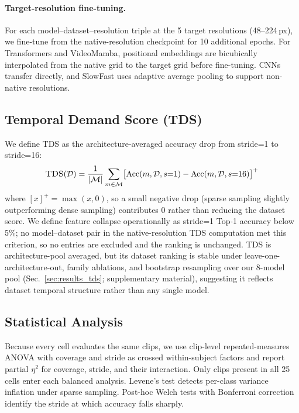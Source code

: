 \documentclass[runningheads]{llncs}
\newcommand{\TDS}{\textsc{TDS}}
\newcommand{\rev}[1]{\textcolor{revblue}{#1}}
\newcommand{\revdel}[1]{}
\begin{document}
\paragraph{Target-resolution fine-tuning.}
For each model--dataset--resolution triple at the 5 target resolutions (48--224\,px), we fine-tune from the native-resolution checkpoint for 10 additional epochs. For Transformers and VideoMamba, positional embeddings are bicubically interpolated from the native grid to the target grid before fine-tuning. CNNs transfer directly, and SlowFast uses adaptive average pooling to support non-native resolutions.

\subsection{Temporal Demand Score (\texorpdfstring{\TDS{}}{TDS})}

We define \TDS{} as the architecture-averaged accuracy drop from stride=1 to stride=16:
\begin{equation}
  \TDS(\mathcal{D}) = \frac{1}{|\mathcal{M}|} \sum_{m\in\mathcal{M}} \bigl[\mathrm{Acc}(m,\mathcal{D},s{=}1) - \mathrm{Acc}(m,\mathcal{D},s{=}16)\bigr]^+
  \label{eq:tds}
\end{equation}
where $[x]^+=\max(x,0)$, so a small negative drop (sparse sampling slightly outperforming dense sampling) contributes 0 rather than reducing the dataset score. We define feature collapse operationally as stride=1 Top-1 accuracy below 5\%; no model--dataset pair in the native-resolution \TDS{} computation met this criterion, so no entries are excluded and the ranking is unchanged. \TDS{} is architecture-pool averaged, but its dataset ranking is stable under leave-one-architecture-out, family ablations, and bootstrap resampling over our 8-model pool (Sec.~\ref{sec:results_tds}; supplementary material), suggesting it reflects dataset temporal structure rather than any single model.

\subsection{Statistical Analysis}

\revdel{For each model-dataset pair, two-way ANOVA decomposes accuracy variance into coverage and stride components (effect size $\eta^2$).} \rev{Because every cell evaluates the same clips, we use clip-level repeated-measures ANOVA with coverage and stride as crossed within-subject factors and report partial $\eta^2$ for coverage, stride, and their interaction. Only clips present in all 25 cells enter each balanced analysis.} Levene's test detects per-class variance inflation under sparse sampling. Post-hoc Welch tests with Bonferroni correction identify \rev{the stride at which accuracy falls sharply}.
\end{document}
